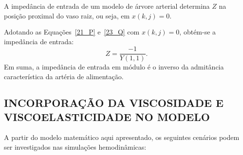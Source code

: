 A impedância de entrada de um modelo de árvore arterial determina $Z$ na posição proximal do vaso raiz, ou seja, em $x (k,j) = 0$. 

Adotando as Equações~\eqref{21_P} e~\eqref{23_Q} com $x (k,j) = 0$, obtém-se a impedância de entrada:
\begin{equation}
	Z = \frac{-1}{Y(1,1)}.
\end{equation}
Em suma, a impedância de entrada  em módulo é o inverso da admitância característica da artéria de alimentação.

\subsection{INCORPORAÇÃO DA VISCOSIDADE E VISCOELASTICIDADE NO MODELO}
\label{sec:cenario}
A partir do modelo matemático aqui apresentado, os seguintes cenários podem ser investigados nas simulações hemodinâmicas:
